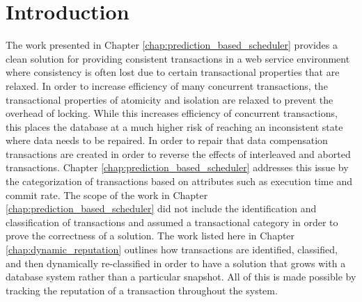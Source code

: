 \section{Introduction}
\label{rep:introduction}

The work presented in Chapter \ref{chap:prediction_based_scheduler} provides a clean solution for providing consistent transactions in a web service environment where consistency is often lost due to certain transactional properties that are relaxed. In order to increase efficiency of many concurrent transactions, the transactional properties of atomicity and isolation are relaxed to prevent the overhead of locking. While this increases efficiency of concurrent transactions, this places the database at a much higher risk of reaching an inconsistent state where data needs to be repaired. In order to repair that data compensation transactions are created in order to reverse the effects of interleaved and aborted transactions. Chapter \ref{chap:prediction_based_scheduler} addresses this issue by the categorization of transactions based on attributes such as execution time and commit rate. The scope of the work in Chapter \ref{chap:prediction_based_scheduler} did not include the identification and classification of transactions and assumed a transactional category in order to prove the correctness of a solution. The work listed here in Chapter \ref{chap:dynamic_reputation} outlines how transactions are identified, classified, and then dynamically re-classified in order to have a solution that grows with a database system rather than a particular snapshot. All of this is made possible by tracking the reputation of a transaction throughout the system.